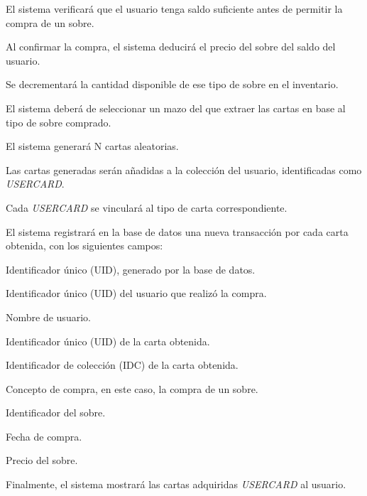 \begin{RFSobres}
	\begin{RFSobres}
		\item El sistema verificará que el usuario tenga saldo suficiente antes de permitir la compra de un sobre.
		\item Al confirmar la compra, el sistema deducirá el precio del sobre del saldo del usuario.
		\item Se decrementará la cantidad disponible de ese tipo de sobre en el inventario.
		\item El sistema deberá de seleccionar un mazo del que extraer las cartas en base al tipo de sobre comprado.
		\item El sistema generará N cartas aleatorias.
		\item Las cartas generadas serán añadidas a la colección del usuario, identificadas como \textit{USERCARD}.
		\item Cada \textit{USERCARD} se vinculará al tipo de carta correspondiente.
		\item El sistema registrará en la base de datos una nueva transacción por cada carta obtenida, con los siguientes campos:
		\begin{RFSobres}
			\item Identificador único (UID), generado por la base de datos.
			\item Identificador único (UID) del usuario que realizó la compra.
			\item Nombre de usuario.
			\item Identificador único (UID) de la carta obtenida.
			\item Identificador de colección (IDC) de la carta obtenida.
			\item Concepto de compra, en este caso, la compra de un sobre.
			\item Identificador del sobre.
			\item Fecha de compra.
			\item Precio del sobre.
		\end{RFSobres}
		\item Finalmente, el sistema mostrará las cartas adquiridas \textit{USERCARD} al usuario.
	\end{RFSobres}
\end{RFSobres}